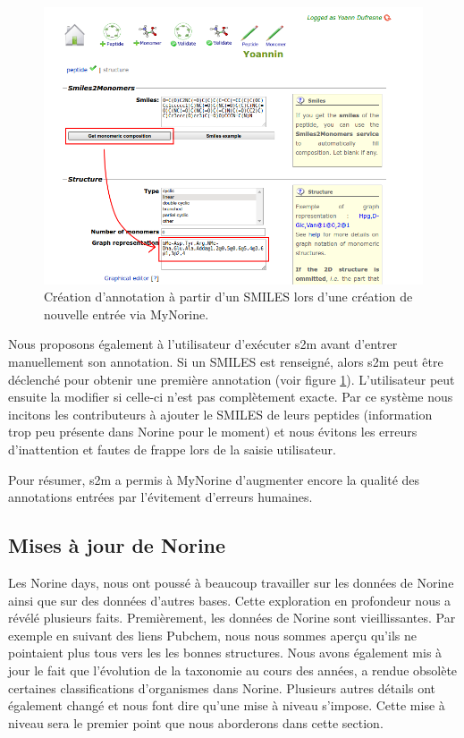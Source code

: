 \begin{figure}[h!]
  \begin{center}
    \includegraphics[width=450px]{Figures/contributions/s2m_automatic.png}
    \caption{\label{s2m_automatic}Création d'annotation à partir d'un SMILES lors d'une création de nouvelle entrée via MyNorine.}
  \end{center}
\end{figure}

Nous proposons également à l'utilisateur d'exécuter s2m avant d'entrer manuellement son annotation.
Si un SMILES est renseigné, alors s2m peut être déclenché pour obtenir une première annotation (voir figure \ref{s2m_automatic}).
L'utilisateur peut ensuite la modifier si celle-ci n'est pas complètement exacte.
Par ce système nous incitons les contributeurs à ajouter le SMILES de leurs peptides (information trop peu présente dans Norine pour le moment) et nous évitons les erreurs d'inattention et fautes de frappe lors de la saisie utilisateur.

Pour résumer, s2m a permis à MyNorine d'augmenter encore la qualité des annotations entrées par l'évitement d'erreurs humaines.




\subsection{Mises à jour de Norine}

Les Norine days, nous ont poussé à beaucoup travailler sur les données de Norine ainsi que sur des données d'autres bases.
Cette exploration en profondeur nous a révélé plusieurs faits.
Premièrement, les données de Norine sont vieillissantes.
Par exemple en suivant des liens Pubchem, nous nous sommes aperçu qu'ils ne pointaient plus tous vers les les bonnes structures.
Nous avons également mis à jour le fait que l'évolution de la taxonomie au cours des années, a rendue obsolète certaines classifications d'organismes dans Norine.
Plusieurs autres détails ont également changé et nous font dire qu'une mise à niveau s'impose.
Cette mise à niveau sera le premier point que nous aborderons dans cette section.

